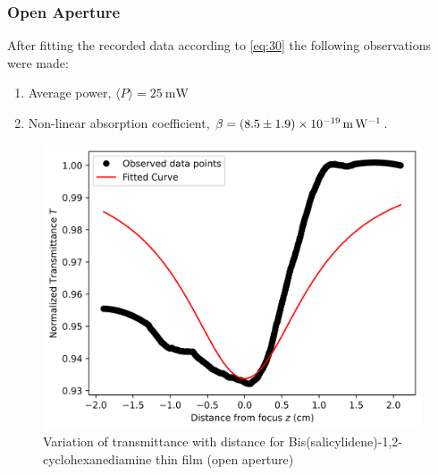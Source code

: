 \documentclass[%
 reprint,
 amsmath,amssymb,
 aps,
]{revtex4-2}
\begin{document}
		\subsubsection{Open Aperture}
		After fitting the recorded data according to \eqref{eq:30} the following observations were made:
		\begin{enumerate} 
			\item Average power, $ \langle P \rangle  = \SI{25}{\milli \watt}$
			\item Non-linear absorption coefficient, $ \beta = \SI[separate-uncertainty=true]{8.5 \pm 1.9e-19}{\meter \per \watt} $.
		\end{enumerate}
		\begin{figure}
			\includegraphics[scale = 0.59]{org-o}
			\caption{Variation of transmittance with distance for Bis(salicylidene)-1,2-cyclohexanediamine thin film (open aperture)}
		\end{figure}
		
\end{document}
